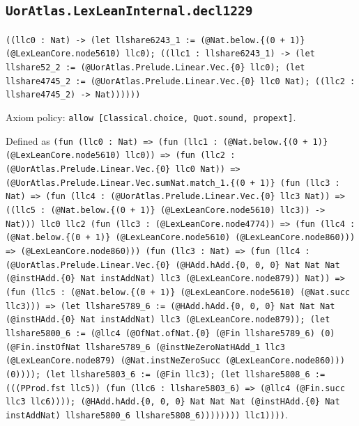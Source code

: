 \documentclass[11pt]{article}
\begin{document}
\subsection*{\texttt{UorAtlas.LexLeanInternal.decl1229}}
\noindent\texttt{((llc0 : Nat) -> (let llshare6243\_1 := (@Nat.below.\{(0 + 1)\} (@LexLeanCore.node5610) llc0); ((llc1 : llshare6243\_1) -> (let llshare52\_2 := (@UorAtlas.Prelude.Linear.Vec.\{0\} llc0); (let llshare4745\_2 := (@UorAtlas.Prelude.Linear.Vec.\{0\} llc0 Nat); ((llc2 : llshare4745\_2) -> Nat))))))}\par
\noindent Axiom policy: \texttt{allow [Classical.choice, Quot.sound, propext]}.\par
\noindent Defined as \texttt{(fun (llc0 : Nat) => (fun (llc1 : (@Nat.below.\{(0 + 1)\} (@LexLeanCore.node5610) llc0)) => (fun (llc2 : (@UorAtlas.Prelude.Linear.Vec.\{0\} llc0 Nat)) => (@UorAtlas.Prelude.Linear.Vec.sumNat.match\_1.\{(0 + 1)\} (fun (llc3 : Nat) => (fun (llc4 : (@UorAtlas.Prelude.Linear.Vec.\{0\} llc3 Nat)) => ((llc5 : (@Nat.below.\{(0 + 1)\} (@LexLeanCore.node5610) llc3)) -> Nat))) llc0 llc2 (fun (llc3 : (@LexLeanCore.node4774)) => (fun (llc4 : (@Nat.below.\{(0 + 1)\} (@LexLeanCore.node5610) (@LexLeanCore.node860))) => (@LexLeanCore.node860))) (fun (llc3 : Nat) => (fun (llc4 : (@UorAtlas.Prelude.Linear.Vec.\{0\} (@HAdd.hAdd.\{0, 0, 0\} Nat Nat Nat (@instHAdd.\{0\} Nat instAddNat) llc3 (@LexLeanCore.node879)) Nat)) => (fun (llc5 : (@Nat.below.\{(0 + 1)\} (@LexLeanCore.node5610) (@Nat.succ llc3))) => (let llshare5789\_6 := (@HAdd.hAdd.\{0, 0, 0\} Nat Nat Nat (@instHAdd.\{0\} Nat instAddNat) llc3 (@LexLeanCore.node879)); (let llshare5800\_6 := (@llc4 (@OfNat.ofNat.\{0\} (@Fin llshare5789\_6) (0) (@Fin.instOfNat llshare5789\_6 (@instNeZeroNatHAdd\_1 llc3 (@LexLeanCore.node879) (@Nat.instNeZeroSucc (@LexLeanCore.node860))) (0)))); (let llshare5803\_6 := (@Fin llc3); (let llshare5808\_6 := (((PProd.fst llc5)) (fun (llc6 : llshare5803\_6) => (@llc4 (@Fin.succ llc3 llc6)))); (@HAdd.hAdd.\{0, 0, 0\} Nat Nat Nat (@instHAdd.\{0\} Nat instAddNat) llshare5800\_6 llshare5808\_6)))))))) llc1))))}.\par
\end{document}
